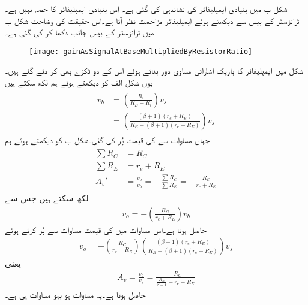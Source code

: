 شکل  ب میں بنیادی ایمپلیفائر کی نشاندہی کی گئی ہے۔ اس بنیادی ایمپلیفائر کا حصہ نہیں ہے۔ٹرانزسٹر کے بیس سے دیکھتے ہوئے ایمپلیفائر مزاحمت  نظر آتا ہے۔اس حقیقت کی وضاحت شکل  ب میں ٹرانزسٹر کے بیس جانب  دکھا کر کی گئی ہے۔ 
\begin{figure}
\centering
\texttt{[image: gainAsSignalAtBaseMultipliedByResistorRatio]}
\caption{}
\label{شکل_ٹرانزسٹر_افزائش_کو_داخلی_مزاحمت_کی_مدد_سے}
\end{figure}

شکل  میں ایمپلیفائر کا باریک اشاراتی مساوی دور بناتے ہوئے اس کے دو ٹکڑے بھی کر دئے گئے ہیں۔یوں  شکل  الف کو دیکھتے ہوئے ہم لکھ سکتے ہیں
\begin{gather}
\begin{aligned}\label{مساوات_ٹرانزسٹر_قابو_پر_برقی_دباو_کی_مساوات}
v_b&=\left(\frac{R_i}{R_B+R_i} \right) v_s\\
&=\left(\frac{\left(\beta+1 \right) \left(r_e+R_E \right)}{R_B+\left(\beta+1 \right) \left(r_e+R_E \right)} \right) v_s
\end{aligned}
\end{gather}
جہاں مساوات  سے  کی قیمت پُر کی گئی۔شکل  ب کو دیکھتے ہوئے ہم
\begin{gather}
\begin{aligned}
\sum{R_C}&=R_C\\
\sum{R_E}&=r_e+R_E\\
A_v'&=\frac{v_o}{v_b}=-\frac{\sum R_C}{\sum R_E}=-\frac{R_C}{r_e+R_E}
\end{aligned}
\end{gather}
لکھ سکتے ہیں جس سے
\begin{align}
v_o=-\left(\frac{R_C}{r_e+R_E}\right) v_b
\end{align}
حاصل ہوتا ہے۔اس مساوات میں  کی قیمت مساوات   سے پُر کرتے ہوئے
\begin{align}
v_o=-\left(\frac{R_C}{r_e+R_E}\right) \left(\frac{\left(\beta+1 \right) \left(r_e+R_E \right)}{R_B+\left(\beta+1 \right) \left(r_e+R_E \right)} \right) v_s
\end{align}
یعنی
\begin{align}\label{مساوات_ٹرانزسٹر_داخلی_مزاحمت_بالمقابل_افزائش}
A_v=\frac{v_o}{v_s}=\frac{-R_C}{\frac{R_B}{\beta+1}+r_e+R_E}
\end{align}
حاصل ہوتا ہے۔یہ مساوات ہو بہو مساوات  ہی ہے۔

